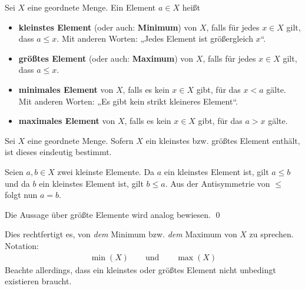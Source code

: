 \begin{de} \label{def:kleinstes}      
Sei $X$ eine geordnete Menge. Ein Element $a\in X$ heißt
    \begin{itemize}
        \item \textbf{kleinstes Element} (oder auch: \textbf{Minimum}) von $X$, falls für jedes $x\in X$ gilt, dass $a\le x$. Mit anderen Worten: „Jedes Element ist größergleich $x$“.
        \item \textbf{größtes Element} (oder auch: \textbf{Maximum}) von $X$, falls für jedes $x\in X$ gilt, dass $a\le x$.
        \item \textbf{minimales Element} von $X$, falls es kein $x\in X$ gibt, für das $x<a$ gälte. Mit anderen Worten: „Es gibt kein strikt kleineres Element“.
        \item \textbf{maximales Element} von $X$, falls es kein $x\in X$ gibt, für das $a>x$ gälte.
    \end{itemize}
\end{de}


\begin{satz} \label{kleinsteseind}
    Sei $X$ eine geordnete Menge. Sofern $X$ ein kleinstes bzw. größtes Element enthält, ist dieses eindeutig bestimmt.
\end{satz}
    
    
\begin{bew}
    Seien $a,b\in X$ zwei kleinste Elemente. Da $a$ ein kleinstes Element ist, gilt $a\le b$ und da $b$ ein kleinstes Element ist, gilt $b\le a$. Aus der Antisymmetrie von $\le$ folgt nun $a=b$.

    Die Aussage über größte Elemente wird analog bewiesen. \qed
\end{bew}


\begin{nota}
    Dies rechtfertigt es, von \emph{dem} Minimum bzw. \emph{dem} Maximum von $X$ zu sprechen. Notation:
    \begin{align*}
        \min(X) \qquad\text{und}\qquad \max(X)
    \end{align*}
    Beachte allerdings, dass ein kleinstes oder größtes Element nicht unbedingt existieren braucht.
\end{nota}


